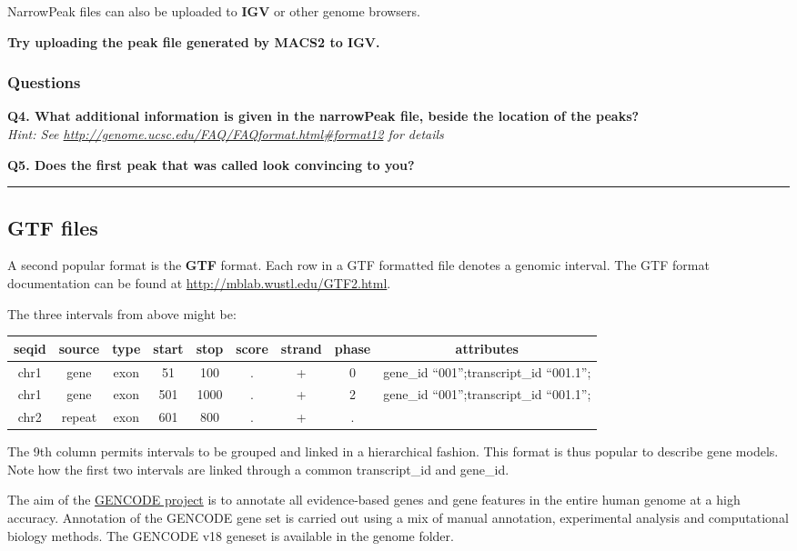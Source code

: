 \documentclass[11pt]{article}
\begin{document}
    NarrowPeak files can also be uploaded to \textbf{IGV} or other genome
browsers.

\textbf{Try uploading the peak file generated by MACS2 to IGV.}

    \hypertarget{questions}{%
\subsubsection{Questions}\label{questions}}

\textbf{Q4. What additional information is given in the narrowPeak file,
beside the location of the peaks?}\\
\textit{Hint: See
\url{http://genome.ucsc.edu/FAQ/FAQformat.html\#format12} for details}

\textbf{Q5. Does the first peak that was called look convincing to you?}

    \begin{center}\rule{0.5\linewidth}{.4pt}\end{center}

    \hypertarget{gtf-files}{%
\subsection{GTF files}\label{gtf-files}}

A second popular format is the \textbf{GTF} format. Each row in a GTF
formatted file denotes a genomic interval. The GTF format documentation
can be found at \url{http://mblab.wustl.edu/GTF2.html}.

The three intervals from above might be:

    \begin{longtable}[]{@{}ccccccccc@{}}
\hline
seqid & source & type & start & stop & score & strand & phase &
attributes\tabularnewline
\hline
\endhead
chr1 & gene & exon & 51 & 100 & . & + & 0 & gene\_id
``001'';transcript\_id ``001.1'';\tabularnewline
chr1 & gene & exon & 501 & 1000 & . & + & 2 & gene\_id
``001'';transcript\_id ``001.1'';\tabularnewline
chr2 & repeat & exon & 601 & 800 & . & + & . &\tabularnewline
\hline
\end{longtable}

    The 9th column permits intervals to be grouped and linked in a
hierarchical fashion. This format is thus popular to describe gene
models. Note how the first two intervals are linked through a common
transcript\_id and gene\_id.

The aim of the \href{https://www.gencodegenes.org/}{GENCODE project} is
to annotate all evidence-based genes and gene features in the entire
human genome at a high accuracy. Annotation of the GENCODE gene set is
carried out using a mix of manual annotation, experimental analysis and
computational biology methods. The GENCODE v18 geneset is available in
the genome folder.
\end{document}
